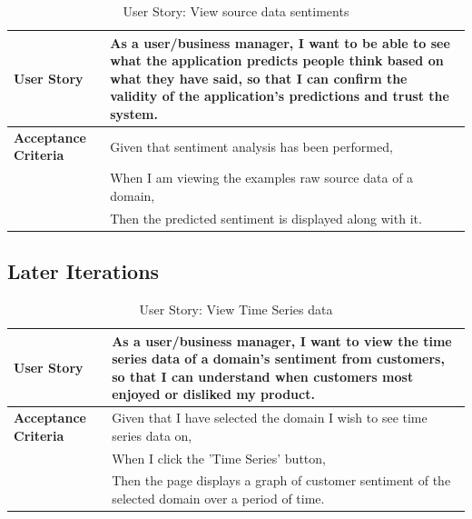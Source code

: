 \documentclass[12pt]{article}
\begin{document}
\begin{table}[htbp]
  \caption{User Story: View source data sentiments}
  \begin{tabular}{|p{}|p{}|}
    \hline
    \textbf{User Story}          & As a user/business manager, I want to be able to see what the application predicts people think based on what they have said, so that I can confirm the validity of the application’s predictions and trust the system. \\
    \hline
    \textbf{Acceptance Criteria} &
    Given that sentiment analysis has been performed,                                                                                                                                                                                                      \\
                                 & When I am viewing the examples raw source data of a domain,                                                                                                                                                             \\
                                 & Then the predicted sentiment is displayed along with it.                                                                                                                                                                \\
    \hline
  \end{tabular}
\end{table}
\newpage
\subsection{Later Iterations}
\begin{table}[htbp]
  \caption{User Story: View Time Series data}
  \begin{tabular}{|p{}|p{}|}
    \hline
    \textbf{User Story}          & As a user/business manager, I want to view the time series data of a domain's sentiment from customers, so that I can understand when customers most enjoyed or disliked my product. \\
    \hline
    \textbf{Acceptance Criteria} &
    Given that I have selected the domain I wish to see time series data on,                                                                                                                                            \\
                                 & When I click the 'Time Series' button,                                                                                                                                               \\
                                 & Then the page displays a graph of customer sentiment of the selected domain over a period of time.                                                                                   \\
    \hline
  \end{tabular}
\end{table}
\end{document}
